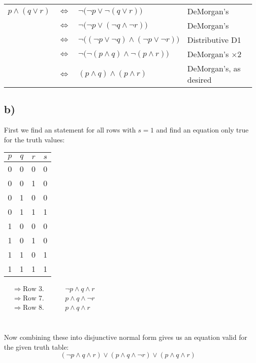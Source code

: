 \documentclass{article}
\begin{document}
\begin{table}[htp]
    \centering
    \begin{tabular}{ccll}
        $p \land (q \lor r)$ & $\Leftrightarrow$ & $\lnot\big(\lnot p \lor \lnot(q \lor r)\big)$ & DeMorgan's\\
         & $\Leftrightarrow$ & $\lnot\big(\lnot p \lor (\lnot q \land \lnot r)\big)$ & DeMorgan's\\
         & $\Leftrightarrow$ & $\lnot\big( (\lnot p \lor \lnot q) \land (\lnot p \lor \lnot r)\big)$ & Distributive D1\\
         & $\Leftrightarrow$ & $\lnot\big( \lnot (p \land q) \land \lnot ( p \land r)\big)$  & DeMorgan's $\times 2$\\ 
         & $\Leftrightarrow$ & $ (p \land q) \land ( p \land r)$  & DeMorgan's, as desired\\ 
    \end{tabular}
\end{table}

\subsection*{b)}
First we find an statement for all rows with $s=1$ and find an equation only true for the truth values:
\begin{table}[htp]
\centering
    \begin{tabular}{|c|c|c|c|}
        $p$ & $q$ & $r$ & $s$\\
         \hline
         0& 0 & 0 & 0\\
         0& 0 & 1 & 0\\
         0& 1 & 0 & 0\\
         0& 1 & 1 & 1\\
         1& 0 & 0 & 0\\
         1& 0 & 1 & 0\\
         1& 1 & 0 & 1\\
         1& 1 & 1 & 1\\
    \end{tabular}
    \;\;\;\;\;\;\;\;\;\;\;\;\;\;\;
$    \begin{aligned}
        &\Longrightarrow \text{Row 3.}\;\;\;\;\;\;\;\;\;\;\; \lnot p \land q \land r\\
        &\Longrightarrow \text{Row 7.}\;\;\;\;\;\;\;\;\;\;\;  p \land q\land \lnot r\\
        &\Longrightarrow \text{Row 8.}\;\;\;\;\;\;\;\;\;\;\; p \land q\land r\\
    \end{aligned}$\;\;\;\;\;\;\;\;\;\;\;\;\;\;\;\;\;
\end{table}\\
Now combining these into disjunctive normal form gives us an equation valid for the given truth table:$$(\lnot p \land q \land r)\lor(p \land q\land \lnot r)\lor(p \land q\land r)$$
\end{document}
